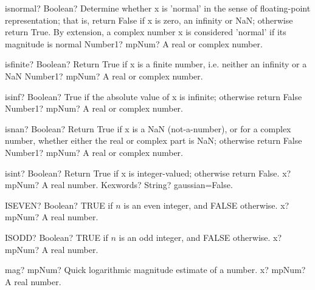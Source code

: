 \documentclass[12pt,a4paper,openany]{book}
\begin{document}
\begin{mpFunctionsExtract}
\mpFunctionOne
{isnormal? Boolean?  Determine whether x is 'normal' in the sense of floating-point representation; that is, return False if x is zero, an infinity or NaN; otherwise return True. By extension, a complex number x is considered 'normal' if its magnitude is normal}
{Number1? mpNum? A real or complex number.}
\end{mpFunctionsExtract}

\begin{mpFunctionsExtract}
\mpFunctionOne
{isfinite? Boolean?  Return True if x is a finite number, i.e. neither an infinity or a NaN}
{Number1? mpNum? A real or complex number.}
\end{mpFunctionsExtract}

\begin{mpFunctionsExtract}
\mpFunctionOne
{isinf? Boolean?  True if the absolute value of x is infinite; otherwise return False}
{Number1? mpNum? A real or complex number.}
\end{mpFunctionsExtract}

\begin{mpFunctionsExtract}
\mpFunctionOne
{isnan? Boolean?  Return True if x is a NaN (not-a-number), or for a complex number, whether either the real or complex part is NaN; otherwise return False}
{Number1? mpNum? A real or complex number.}
\end{mpFunctionsExtract}

\begin{mpFunctionsExtract}
\mpFunctionTwo
{isint? Boolean? Return True if x is integer-valued; otherwise return False.}
{x? mpNum? A real number.}
{Kexwords? String? gaussian=False.}
\end{mpFunctionsExtract}

\begin{mpFunctionsExtract}
\mpWorksheetFunctionOneNotImplemented
{ISEVEN? Boolean? TRUE if $n$ is an even integer, and FALSE otherwise.}
{x? mpNum? A real number.}
\end{mpFunctionsExtract}

\begin{mpFunctionsExtract}
\mpWorksheetFunctionOneNotImplemented
{ISODD? Boolean? TRUE if $n$ is an odd integer, and FALSE otherwise.}
{x? mpNum? A real number.}
\end{mpFunctionsExtract}

\begin{mpFunctionsExtract}
\mpFunctionOne
{mag? mpNum? Quick logarithmic magnitude estimate of a number.}
{x? mpNum? A real number.}
\end{mpFunctionsExtract}
\end{document}
